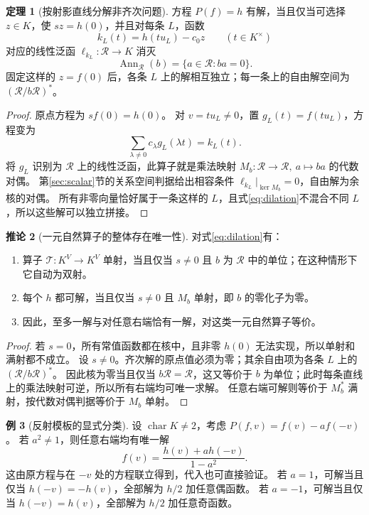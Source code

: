 \documentclass[UTF8,11pt,a4paper]{ctexart}
\theoremstyle{definition}
\newtheorem{theorem}{定理}[section]
\newtheorem{corollary}[theorem]{推论}
\newtheorem{example}[theorem]{例}
\newcommand{\T}{\mathcal T}
\numberwithin{equation}{section}
\begin{document}
\begin{theorem}[按射影直线分解非齐次问题]\label{thm:dilationsolve}
方程 $P(f)=h$ 有解，当且仅当可选择 $z\in K$，使 $sz=h(0)$，并且对每条 $L$，函数
\[
 k_L(t)=h(tu_L)-c_0z\qquad(t\in K^\times)
\]
对应的线性泛函 $\ell_{k_L}:\mathcal R\to K$ 消灭
\[
 \operatorname{Ann}_{\mathcal R}(b)=\{a\in\mathcal R:ba=0\}.
\]
固定这样的 $z=f(0)$ 后，各条 $L$ 上的解相互独立；每一条上的自由解空间为 $(\mathcal R/b\mathcal R)^*$。
\end{theorem}
\begin{proof}
原点方程为 $sf(0)=h(0)$。
对 $v=tu_L\ne0$，置 $g_L(t)=f(tu_L)$，方程变为
\[
 \sum_{\lambda\ne0}c_\lambda g_L(\lambda t)=k_L(t).
\]
将 $g_L$ 识别为 $\mathcal R$ 上的线性泛函，此算子就是乘法映射
$M_b:\mathcal R\to\mathcal R,\ a\mapsto ba$ 的代数对偶。
第\ref{sec:scalar}节的关系空间判据给出相容条件 $\ell_{k_L}|_{\ker M_b}=0$，自由解为余核的对偶。
所有非零向量恰好属于一条这样的 $L$，且式\eqref{eq:dilation}不混合不同 $L$，所以这些解可以独立拼接。
\end{proof}

\begin{corollary}[一元自然算子的整体存在唯一性]\label{cor:dilationbij}
对式\eqref{eq:dilation}有：
\begin{enumerate}
\item 算子 $\T:K^V\to K^V$ 单射，当且仅当 $s\ne0$ 且 $b$ 为 $\mathcal R$ 中的单位；在这种情形下它自动为双射。
\item 每个 $h$ 都可解，当且仅当 $s\ne0$ 且 $M_b$ 单射，即 $b$ 的零化子为零。
\item 因此，至多一解与对任意右端恰有一解，对这类一元自然算子等价。
\end{enumerate}
\end{corollary}
\begin{proof}
若 $s=0$，所有常值函数都在核中，且非零 $h(0)$ 无法实现，所以单射和满射都不成立。
设 $s\ne0$。齐次解的原点值必须为零；其余自由项为各条 $L$ 上的 $(\mathcal R/b\mathcal R)^*$。
因此核为零当且仅当 $b\mathcal R=\mathcal R$，这又等价于 $b$ 为单位；此时每条直线上的乘法映射可逆，所以所有右端均可唯一求解。
任意右端可解则等价于 $M_b^*$ 满射，按代数对偶判据等价于 $M_b$ 单射。
\end{proof}

\begin{example}[反射模板的显式分类]
设 $\operatorname{char}K\ne2$，考虑 $P(f,v)=f(v)-a f(-v)$。
若 $a^2\ne1$，则任意右端均有唯一解
\[
 f(v)=\frac{h(v)+a h(-v)}{1-a^2}.
\]
这由原方程与在 $-v$ 处的方程联立得到，代入也可直接验证。
若 $a=1$，可解当且仅当 $h(-v)=-h(v)$，全部解为 $h/2$ 加任意偶函数。
若 $a=-1$，可解当且仅当 $h(-v)=h(v)$，全部解为 $h/2$ 加任意奇函数。
\end{example}
\end{document}
